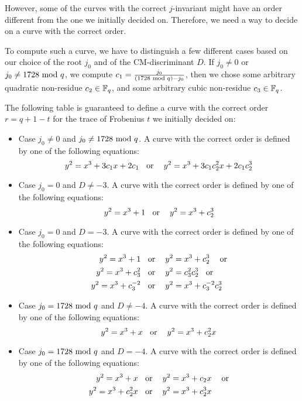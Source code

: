 However, some of the curves with the correct $j$-invariant might have an order different from the one we initially decided on. Therefore, we need a way to decide on a curve with the correct order. 

To compute such a curve, we have to distinguish a few different cases based on our choice of the root $j_0$ and of the CM-discriminant $D$. If $j_0\neq 0$ or $j_0\neq 1728 \text{ mod } q$, we compute $c_1=\frac{j_0}{(1728 \text{ mod } q) -j_0}$, then we chose some arbitrary quadratic non-residue $c_2\in \mathbb{F}_q$, and some arbitrary cubic non-residue $c_3\in \mathbb{F}_q$. 

The following table is guaranteed to define a curve with the correct order $r= q+1 -t$ for the trace of Frobenius $t$ we initially decided on:
\begin{definition}\label{def:curve-order-frobenius}
\begin{itemize}
\item Case $j_0 \neq 0 $ and $j_0\neq 1728 \text{ mod } q$. A curve with the correct order is defined by one of the following equations:
\begin{equation}
y^2 = x^3 + 3c_1x + 2c_1 \text{\;\; or \;\; } y^2 = x^3 + 3c_1c_2^2x + 2c_1c_2^3
\end{equation}
\item Case $j_0 = 0 $ and $D\neq -3$. A curve with the correct order is defined by one of the following equations:
\begin{equation}
y^2 = x^3 + 1 \text{\;\; or \;\; } y^2 = x^3 + c_2^3
\end{equation}
\item Case $j_0 = 0 $ and $D= -3$. A curve with the correct order is defined by one of the following equations:
\begin{align*}
y^2 = x^3 +1 & \text{\;\; or \;\; } y^2 = x^3 + c_2^3 \text{ \;\; or}\\  
y^2 = x^3 + c_3^2 & \text{\;\; or \;\; } y^2 = c_3^2 c_2^3 \text{\;\; or}\\
y^2 = x^3 + c_3^{-2} & \text{\;\; or \;\; }  y^2 = x^3 + c_3^{-2}c_2^3 
\end{align*}
\item Case $j_0 = 1728 \text{ mod } q $ and $D\neq -4$. A curve with the correct order is defined by one of the following equations:
\begin{equation}
y^2 = x^3 + x \text{\;\; or \;\; } y^2 = x^3 + c_2^2x
\end{equation}
\item Case $j_0 = 1728 \text{ mod } q $ and $D= -4$. A curve with the correct order is defined by one of the following equations:
\begin{align*}
y^2 = x^3 +x & \text{\;\; or \;\; } y^2 = x^3 + c_2x \text{ \;\; or}\\  
y^2 = x^3 + c_2^2x & \text{\;\; or \;\; } y^2 = x^3 + c_2^3x
\end{align*}
\end{itemize} 
\end{definition}

